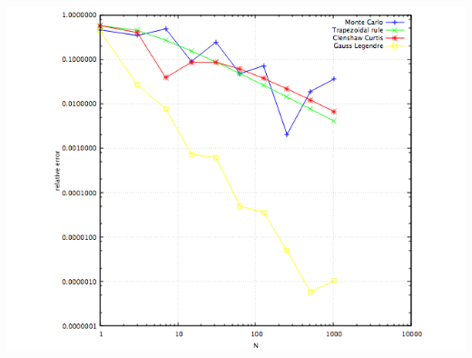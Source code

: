 \documentclass[10pt,a4paper]{article}
\begin{document}
\begin{center}
\includegraphics[scale=0.5]{relative_errors_K10.png}		
\end{center}	
\end{document}
